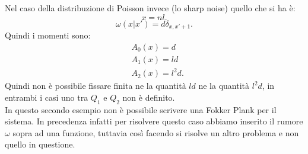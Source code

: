 \noindent
\begin{exmp}
    Nel caso della distribuzione di Poisson invece (lo sharp noise) quello che si ha è:
    \[
        x = nl
    .\] 
    \[
	\omega (x|x') = d\delta_{x,x'+1}
    .\] 
    Quindi i momenti sono:
    \[\begin{aligned}
	&A_0(x) = d\\
	&A_1(x) = ld\\
	&A_2(x) = l^2d
    .\end{aligned}\]
    Quindi non è possibile fissare finita ne la quantità $ld$ ne la quantità $l^2d$, in entrambi i casi uno tra $Q_1$ e $Q_2$ non è definito.\\
    In questo secondo esempio non è possibile scrivere una Fokker Plank per il sistema. In precedenza infatti per risolvere questo caso abbiamo inserito il rumore $\omega$ sopra ad una funzione, tuttavia così facendo si risolve un altro problema e non quello in questione.
\end{exmp}
\clearpage
